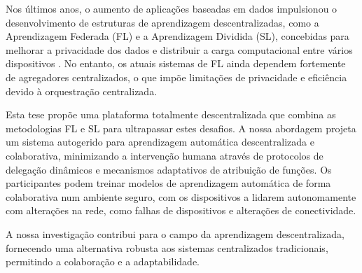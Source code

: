 
%

Nos últimos anos, o aumento de aplicações baseadas em dados impulsionou o desenvolvimento de estruturas de aprendizagem descentralizadas, como a Aprendizagem Federada (FL) e a Aprendizagem Dividida (SL), concebidas para melhorar a privacidade dos dados e distribuir a carga computacional entre vários dispositivos . No entanto, os atuais sistemas de FL ainda dependem fortemente de agregadores centralizados, o que impõe limitações de privacidade e eficiência devido à orquestração centralizada. 

Esta tese propõe uma plataforma totalmente descentralizada que combina as metodologias FL e SL para ultrapassar estes desafios. 
A nossa abordagem projeta um sistema autogerido para aprendizagem automática descentralizada e colaborativa, minimizando a intervenção humana através de protocolos de delegação dinâmicos e mecanismos adaptativos de atribuição de funções. Os participantes podem treinar modelos de aprendizagem automática de forma colaborativa num ambiente seguro, com os dispositivos a lidarem autonomamente com alterações na rede, como falhas de dispositivos e alterações de conectividade.

A nossa investigação contribui para o campo da aprendizagem descentralizada, fornecendo uma alternativa robusta aos sistemas centralizados tradicionais, permitindo a colaboração e a adaptabilidade.

